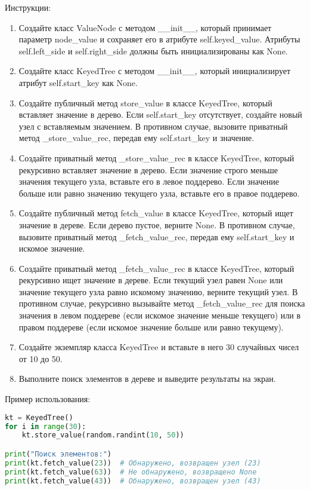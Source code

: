 \begin{enumerate}
Инструкции:
\begin{enumerate}
    \item Создайте класс ValueNode с методом \_\_init\_\_, который принимает параметр node\_value и сохраняет его в атрибуте self.keyed\_value. Атрибуты self.left\_side и self.right\_side должны быть инициализированы как None.
    \item Создайте класс KeyedTree с методом \_\_init\_\_, который инициализирует атрибут self.start\_key как None.
    \item Создайте публичный метод store\_value в классе KeyedTree, который вставляет значение в дерево. Если self.start\_key отсутствует, создайте новый узел с вставляемым значением. В противном случае, вызовите приватный метод \_store\_value\_rec, передав ему self.start\_key и значение.
    \item Создайте приватный метод \_store\_value\_rec в классе KeyedTree, который рекурсивно вставляет значение в дерево. Если значение строго меньше значения текущего узла, вставьте его в левое поддерево. Если значение больше или равно значению текущего узла, вставьте его в правое поддерево.
    \item Создайте публичный метод fetch\_value в классе KeyedTree, который ищет значение в дереве. Если дерево пустое, верните None. В противном случае, вызовите приватный метод \_fetch\_value\_rec, передав ему self.start\_key и искомое значение.
    \item Создайте приватный метод \_fetch\_value\_rec в классе KeyedTree, который рекурсивно ищет значение в дереве. Если текущий узел равен None или значение текущего узла равно искомому значению, верните текущий узел. В противном случае, рекурсивно вызывайте метод \_fetch\_value\_rec для поиска значения в левом поддереве (если искомое значение меньше текущего) или в правом поддереве (если искомое значение больше или равно текущему).
    \item Создайте экземпляр класса KeyedTree и вставьте в него 30 случайных чисел от 10 до 50.
    \item Выполните поиск элементов в дереве и выведите результаты на экран.
\end{enumerate}

Пример использования:
\begin{lstlisting}[language=Python]
kt = KeyedTree()
for i in range(30):
    kt.store_value(random.randint(10, 50))

print("Поиск элементов:")
print(kt.fetch_value(23))  # Обнаружено, возвращен узел (23)
print(kt.fetch_value(63))  # Не обнаружено, возвращено None
print(kt.fetch_value(43))  # Обнаружено, возвращен узел (43)
\end{lstlisting}


\end{enumerate}
